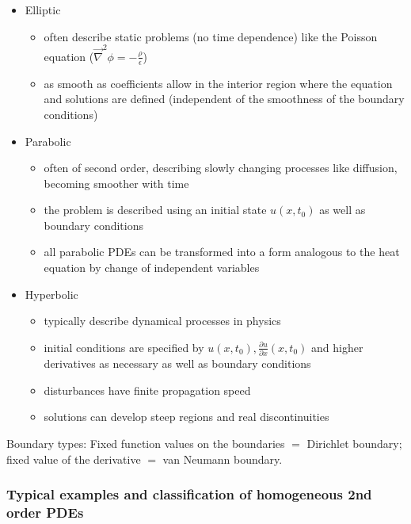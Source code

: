 \begin{itemize}
    \item \textcolor{blue1}{Elliptic}
    \begin{itemize}
        \item often describe static problems (no time dependence) like 
        the Poisson equation ($\vec{\nabla}^2\phi = -\frac{\rho}{\epsilon}$)
        \item as smooth as coefficients allow in the interior region where the equation and solutions are defined (independent of the smoothness of the boundary conditions)
    \end{itemize}
    \item \textcolor{blue1}{Parabolic}
    \begin{itemize}
        \item often of second order, describing slowly changing processes like diffusion, becoming smoother with time
        \item the problem is described using an initial state $u(x,t_0)$ as well as boundary conditions
        \item all parabolic PDEs can be transformed into a form analogous to the heat equation by change of independent variables
    \end{itemize}
    \item \textcolor{blue1}{Hyperbolic}
    \begin{itemize}
        \item typically describe dynamical processes in physics
        \item initial conditions are specified by $u(x,t_0), \frac{\partial u}{\partial x}(x,t_0)$ and higher derivatives as necessary as well as boundary conditions
        \item disturbances have finite propagation speed
        \item solutions can develop steep regions and real discontinuities
    \end{itemize}
\end{itemize}



\textcolor{blue1}{Boundary types:} Fixed function values on the boundaries $=$ Dirichlet boundary; fixed value of the derivative $=$ van Neumann boundary.

\subsubsection{Typical examples and classification of homogeneous 2nd order PDEs}

